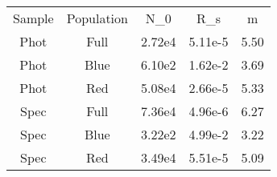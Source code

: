 \begin{table}
\begin{tabular}{ccccc}
Sample & Population & N_0 & R_s & m \\
Phot & Full & 2.72e4 & 5.11e-5 & 5.50 \\
Phot & Blue & 6.10e2 & 1.62e-2 & 3.69 \\
Phot & Red & 5.08e4 & 2.66e-5 & 5.33 \\
Spec & Full & 7.36e4 & 4.96e-6 & 6.27 \\
Spec & Blue & 3.22e2 & 4.99e-2 & 3.22 \\
Spec & Red & 3.49e4 & 5.51e-5 & 5.09 \\
\end{tabular}
\end{table}
